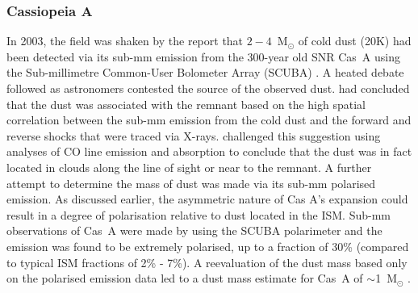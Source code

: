 \subsubsection{Cassiopeia A}

In 2003, the field was shaken by the report that $2-4$~M$_{\odot}$ of cold dust (20K) had been detected via its sub-mm emission from the 300-year old SNR Cas~A using the Sub-millimetre Common-User Bolometer Array (SCUBA) \citep{Dunne2003}.   A heated debate followed as astronomers contested the source of the observed dust.  \citet{Dunne2003} had concluded that the dust was associated with the remnant based on the high spatial correlation between the sub-mm emission from the cold dust and the forward and reverse shocks that were traced via X-rays. \citet{Krause2004} challenged this suggestion using analyses of CO line emission and absorption to conclude that the dust was in fact located in clouds along the line of sight or near to the remnant.  A further attempt to determine the mass of dust was made via its sub-mm polarised emission.  As discussed earlier, the asymmetric nature of Cas A's expansion could result in a degree of polarisation relative to dust located in the ISM.  Sub-mm observations of Cas~A were made by \citet{Dunne2009} using the SCUBA polarimeter and the emission was found to be extremely polarised, up to a fraction of 30\% (compared to typical ISM fractions of 2\% - 7\%).  A reevaluation of the dust mass based only on the polarised emission data led to a dust mass estimate for Cas~A of $\sim$1~M$_{\odot}$ \citep{Dunne2009}.


